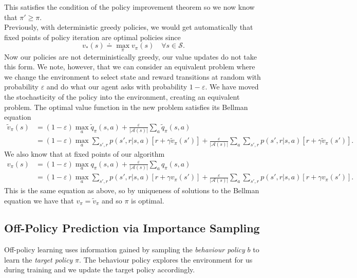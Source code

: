 This satisfies the condition of the policy improvement theorem so we now know that $\pi' \geq \pi$.\\

Previously, with deterministic greedy policies, we would get automatically that fixed points of policy iteration are optimal policies since
\[
    v_*(s) \doteq \max_\pi v_\pi(s) \quad \forall s \in \mathcal{S}.
\]
Now our policies are not deterministically greedy, our value updates do not take this form. We note, however, that we can consider an equivalent problem where we change the environment to select state and reward transitions at random with probability $\varepsilon$ and do what our agent asks with probability $1 - \varepsilon$. We have moved the stochasticity of the policy into the environment, creating an equivalent problem. The optimal value function in the new problem satisfies its Bellman equation
\begin{align}
    \tilde{v}_\pi(s) &= (1 - \varepsilon) \max_a \tilde{q}_\pi(s, a) + \frac{\varepsilon}{|\mathcal{A}(s)|}\sum_a \tilde{q}_\pi(s, a) \\ 
                     &= (1 - \varepsilon) \max_a \sum_{s', r} p(s', r|s, a)[r + \gamma \tilde{v}_\pi(s')] + \frac{\varepsilon}{|\mathcal{A}(s)|} \sum_a \sum_{s', r} p(s', r|s, a)[r + \gamma \tilde{v}_\pi(s')].
\end{align}
We also know that at fixed points of our algorithm
\begin{align}
    v_\pi(s) &= (1 - \varepsilon) \max_a q_\pi(s, a) + \frac{\varepsilon}{|\mathcal{A}(s)|}\sum_a q_\pi(s, a) \\ 
                     &= (1 - \varepsilon) \max_a \sum_{s', r} p(s', r|s, a)[r + \gamma v_\pi(s')] + \frac{\varepsilon}{|\mathcal{A}(s)|} \sum_a \sum_{s', r} p(s', r|s, a)[r + \gamma v_\pi(s')].
\end{align}
This is the same equation as above, so by uniqueness of solutions to the Bellman equation we have that $v_\pi = \tilde{v}_\pi$ and so $\pi$ is optimal.

\subsection{Off-Policy Prediction via Importance Sampling}
Off-policy learning uses information gained by sampling the \emph{behaviour policy} $b$ to learn the \emph{target policy} $\pi$. The behaviour policy explores the environment for us during training and we update the target policy accordingly.\\

